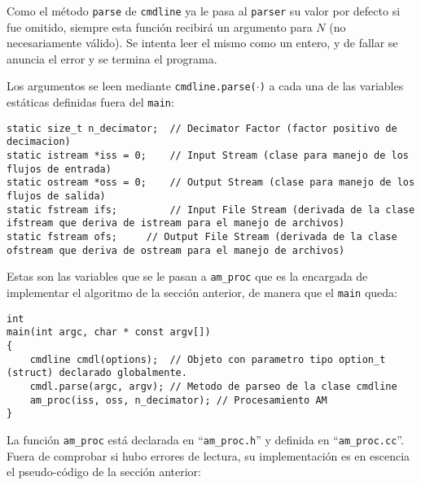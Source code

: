 Como el método \texttt{parse} de \texttt{cmdline} ya le pasa al \texttt{parser} su valor por defecto si fue omitido, siempre esta función recibirá un argumento para $N$ (no necesariamente válido). Se intenta leer el mismo como un entero, y de fallar se anuncia el error y se termina el programa. 

Los argumentos se leen mediante \texttt{cmdline.parse($\cdot$)} a cada una de las variables estáticas definidas fuera del \texttt{main}:

 
\lstset{language=C++}
\begin{lstlisting}[frame=single]
static size_t n_decimator;	// Decimator Factor (factor positivo de decimacion)
static istream *iss = 0;	// Input Stream (clase para manejo de los flujos de entrada)
static ostream *oss = 0;	// Output Stream (clase para manejo de los flujos de salida)
static fstream ifs; 		// Input File Stream (derivada de la clase ifstream que deriva de istream para el manejo de archivos)
static fstream ofs;		// Output File Stream (derivada de la clase ofstream que deriva de ostream para el manejo de archivos)
\end{lstlisting}

Estas son las variables que se le pasan a \texttt{am\_proc} que es la encargada de implementar el algoritmo de la sección anterior, de manera que el \texttt{main} queda:


\lstset{language=C++}
\begin{lstlisting}[frame=single]
int
main(int argc, char * const argv[])
{
	cmdline cmdl(options);	// Objeto con parametro tipo option_t (struct) declarado globalmente.
	cmdl.parse(argc, argv);	// Metodo de parseo de la clase cmdline
	am_proc(iss, oss, n_decimator);	// Procesamiento AM
}
\end{lstlisting}

La función \texttt{am\_proc} está declarada en ``\texttt{am\_proc.h}'' y definida en ``\texttt{am\_proc.cc}''. Fuera de comprobar si hubo errores de lectura, su implementación es en escencia el pseudo-código de la sección anterior:

